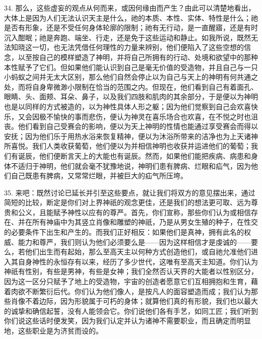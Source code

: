 34. 那么，这些虚妄的观点从何而来，或因何缘由而产生？由此可以清楚地看出，大体上是因为人们无法认识天主是什么，祂的本质、本性、实体、特性是什么；祂是否有形象，还是不受任何身体轮廓的限制；祂有无行动，是一直醒寤，还是有时沉入酣眠；祂是奔跑、端坐、行走，还是免于这些运动和静止。如我所说，既然无法知晓这一切，也无法凭借任何理性的力量来辨别，他们便陷入了这些空想的信念，以至按自己的模样塑造了神明，并将自己所拥有的行动、处境和欲望中的那种本性赋予了它们。但如果他们能认识到自己是毫无价值的受造物，并且自己与一只小蚂蚁之间并无太大区别，那么他们自然会停止以为自己与天上的神明有何共通之处，而将自身卑微渺小限制在恰当的范围之内。但现在，他们看到自己有着面孔、眼睛、头、面颊、耳朵、鼻子，以及我们四肢和肌肉的其余部分，于是便以为神明也是以同样的方式被造的，以为神性具体人形之躯；因为他们觉察到自己会欢喜快乐，又会因极不愉快的事而悲伤，便认为神灵在喜乐场合也欢喜，在不悦之时也沮丧。他们看到自己受赛会的影响，便以为天上神明的性情也能通过享受赛会而得以安抚；因为他们乐于用热水浴来恢复精神，便以为沐浴所带来的洁净也为上天诸神所喜悦。我们人类收获葡萄，他们便以为并相信神明也收获并运进他们的葡萄；我们有诞辰，他们便断言天上的大能也有诞辰。然而，如果他们能把疾病、病患和身体不适归于神明，他们就会毫不犹豫地说，神明们患有脾病、烂眼和疝气，因为他们自己既患有脾病，又常常烂眼，并被巨大的疝气所压垮。\par

35. 来吧：既然讨论已延长并引至这些要点，就让我们将双方的意见摆出来，通过简短的比较，断定是你们对上界神祇的观念更佳，还是我们的想法更可取、远为尊贵和公义，且能赋予神性以应有的尊严。首先，你们宣称，那些你们认为或相信存在、并在所有神庙中为其竖立肖像和雕塑的神祇，乃是从男女生殖的种子，在性交的必要条件下出生和产生的。而我们正好相反：如果他们是真神，拥有此名的权威、能力和尊严，我们则认为他们必须要么是——因为这样相信才是虔诚的——要么，若他们出生而有起始，那么至高天主以何种方式创造他们，或自祂允准他们进入其自身神性的永恒存有以来，经历了多少世代，这唯有至高天主知道。你们认为神祇有性别，有些是男神，有些是女神；我们全然否认天界的大能者以性别区分，因为这一区分只赋予了地上的受造物，宇宙的创造者愿意它们互相拥抱和生育，藉着肉欲不断繁衍后代。你们认为他们像人，是按凡人的面容塑造而成；我们认为那些肖像不着边际，因为形貌属于可朽的身体；就算他们真的有形貌，我们也以最大的诚挚和确信起誓，没有人能领会它。你们说他们各有手艺，如同工匠；我们听到你们说这些话时便发笑，因为我们认定并认为诸神不需要职业，而且确定而明显地，这些职业是为济贫而设的。\par

